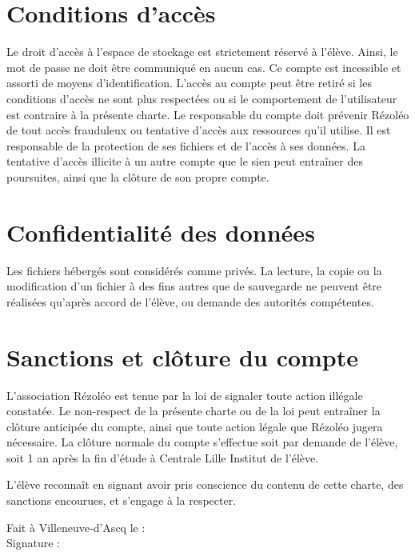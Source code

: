 \documentclass[11pt, a4paper]{article}
\begin{document}
\section{Conditions d'accès}
Le droit d'accès à l'espace de stockage est strictement réservé à l'élève. Ainsi, le mot de passe ne doit être communiqué en aucun cas. Ce compte est incessible et assorti de moyens d'identification. L'accès au compte peut être retiré si les conditions d'accès ne sont plus respectées ou si le comportement de l'utilisateur est contraire à la présente charte. Le responsable du compte doit prévenir Rézoléo de tout accès frauduleux ou tentative d'accès aux ressources qu'il utilise. Il est responsable de la protection de ses fichiers et de l'accès à ses données. La tentative d'accès illicite à un autre compte que le sien peut entraîner des poursuites, ainsi que la clôture de son propre compte.

\section{Confidentialité des données}
Les fichiers hébergés sont considérés comme privés. La lecture, la copie ou la modification d'un fichier à des fins autres que de sauvegarde ne peuvent être réalisées qu'après accord de l'élève, ou demande des autorités compétentes.

\section{Sanctions et clôture du compte}
L'association Rézoléo est tenue par la loi de signaler toute action illégale constatée. Le non-respect de la présente charte ou de la loi peut entraîner la clôture anticipée du compte, ainsi que toute action légale que Rézoléo jugera nécessaire.
La clôture normale du compte s'effectue soit par demande de l'élève, soit 1 an après la fin d'étude à Centrale Lille Institut de l'élève.

\vspace*{2cm}

\noindent L'élève reconnaît en signant avoir pris conscience du contenu de cette charte, des sanctions encourues, et s'engage à la respecter.

\vspace*{0.5cm}

\begin{flushright}
	\begin{minipage}{0.5\linewidth}
		Fait à Villeneuve-d'Ascq le : \dotfill\\
		Signature :
	\end{minipage}
\end{flushright}
\end{document}
